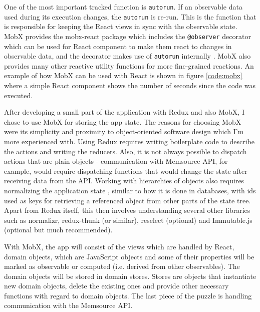 One of the most important tracked function is \texttt{autorun}. If an observable data used during its execution changes, the \texttt{autorun} is re-run. This is the function that is responsible for keeping the React views in sync with the observable state. MobX provides the mobx-react package which includes the \texttt{@observer} decorator which can be used for React component to make them react to changes in observable data, and the decorator makes use of \texttt{autorun} internally \cite{mobx:autorun}.
MobX also provides many other reactive utility functions for more fine-grained reactions. An example of how MobX can be used with React is shown in figure \ref{code:mobx} where a simple React component shows the number of seconds since the code was executed.

\begin{minipage}{\linewidth}

\end{minipage}

After developing a small part of the application with Redux and also MobX, I chose to use MobX for storing the app state. The reasons for choosing MobX were its simplicity and proximity to object-oriented software design which I'm more experienced with. 
Using Redux requires writing boilerplate code to describe the actions and writing the reducers. Also, it is not always possible to dispatch actions that are plain objects - communication with Memsource API, for example, would require dispatching functions that would change the state after receiving data from the API. Working with hierarchies of objects also requires normalizing the application state \cite{redux:normalize}, similar to how it is done in databases, with ids used as keys for retrieving a referenced object from other parts of the state tree. Apart from Redux itself, this then involves understanding several other libraries such as normalizr, redux-thunk (or similar), reselect (optional) and Immutable.js (optional but much recommended).


With MobX, the app will consist of the views which are handled by React, domain objects, which are JavaScript objects and some of their properties will be marked as observable or computed (i.e. derived from other observables). The domain objects will be stored in domain stores. Stores are objects that instantiate new domain objects, delete the existing ones and provide other necessary functions with regard to domain objects. The last piece of the puzzle is handling communication with the Memsource API.

